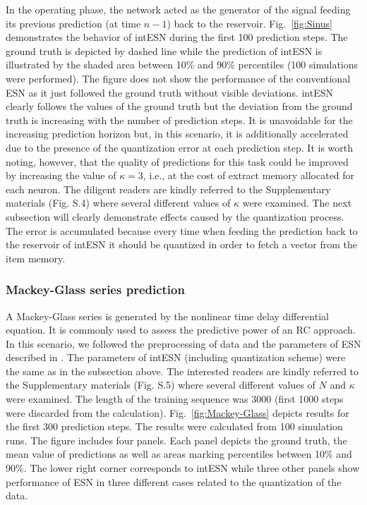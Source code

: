In the operating phase,  the network acted as the generator of the signal
feeding its previous prediction (at time $n-1$) back to the reservoir. 
Fig.~\ref{fig:Sinus} demonstrates  the behavior of intESN during the first 100
prediction steps.  The ground truth is depicted by dashed line while the
prediction of intESN  is  illustrated by the shaded area between 10\% and 90\%
percentiles (100 simulations were performed).  The figure does not show the
performance of the conventional ESN as it just followed the ground truth without
visible deviations. intESN clearly follows the values of the ground truth
but the deviation  from the ground truth is increasing with the number of
prediction steps.  It is unavoidable for the increasing prediction horizon but,
in this scenario,  it is additionally accelerated due to the presence of the
quantization error at each prediction step. 
It is worth noting, however, that the quality of predictions for this task could be improved by increasing the value of $\kappa=3$, i.e., at the cost of extract memory allocated for each neuron. 
The diligent readers are kindly referred to the Supplementary materials (Fig. S.4) where several different values of $\kappa$ were examined. 
The next subsection will clearly demonstrate effects caused by the quantization process. 
The error is accumulated because every time when feeding the prediction back to the reservoir of intESN it should be quantized in order to fetch a vector from the item memory. 




\subsubsection{Mackey-Glass series prediction}

A Mackey-Glass series is generated by the nonlinear time delay differential equation. 
It is commonly used to assess the predictive power of an RC approach.  
In this scenario, we followed  the preprocessing of data and the parameters of
ESN described in \cite{ESN04}.
The parameters of intESN  (including quantization scheme) were the same as in
the subsection above.  
The interested readers are kindly referred to the Supplementary materials (Fig. S.5) where several different values of $N$ and $\kappa$ were examined. 
The length of the training sequence was 3000 (first 1000
steps were discarded from the calculation).
Fig.~\ref{fig:Mackey-Glass} depicts  results for the first 300 prediction
steps. The results were calculated from 100 simulation runs.  The figure
includes four panels. Each panel depicts the  ground truth, the mean value of
predictions as well  as areas marking percentiles between 10\% and 90\%. The
lower right  corner corresponds to intESN while three other panels show
performance of ESN in three different cases related to the quantization of
the data.

